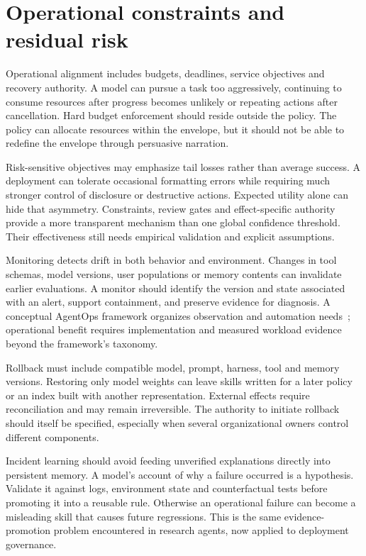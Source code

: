 \section{Operational constraints and residual risk}\label{sec:C29:operations}
Operational alignment includes budgets, deadlines, service objectives and recovery authority. A model can pursue a task too aggressively, continuing to consume resources after progress becomes unlikely or repeating actions after cancellation. Hard budget enforcement should reside outside the policy. The policy can allocate resources within the envelope, but it should not be able to redefine the envelope through persuasive narration.

Risk-sensitive objectives may emphasize tail losses rather than average success. A deployment can tolerate occasional formatting errors while requiring much stronger control of disclosure or destructive actions. Expected utility alone can hide that asymmetry. Constraints, review gates and effect-specific authority provide a more transparent mechanism than one global confidence threshold. Their effectiveness still needs empirical validation and explicit assumptions.

Monitoring detects drift in both behavior and environment. Changes in tool schemas, model versions, user populations or memory contents can invalidate earlier evaluations. A monitor should identify the version and state associated with an alert, support containment, and preserve evidence for diagnosis. A conceptual AgentOps framework organizes observation and automation needs~\cite{corpus250711277}; operational benefit requires implementation and measured workload evidence beyond the framework's taxonomy.

Rollback must include compatible model, prompt, harness, tool and memory versions. Restoring only model weights can leave skills written for a later policy or an index built with another representation. External effects require reconciliation and may remain irreversible. The authority to initiate rollback should itself be specified, especially when several organizational owners control different components.

Incident learning should avoid feeding unverified explanations directly into persistent memory. A model's account of why a failure occurred is a hypothesis. Validate it against logs, environment state and counterfactual tests before promoting it into a reusable rule. Otherwise an operational failure can become a misleading skill that causes future regressions. This is the same evidence-promotion problem encountered in research agents, now applied to deployment governance.


